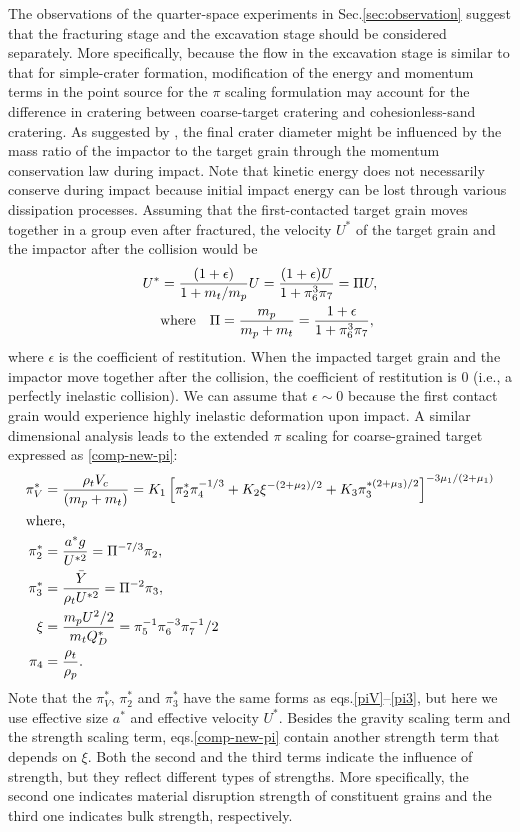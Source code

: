 \documentclass[3p,authoryear]{elsarticle}
\begin{document}
The observations of the quarter-space experiments in Sec.\ref{sec:observation} suggest that the fracturing stage and the excavation stage should be considered separately.
More specifically, because the flow in the excavation stage is similar to that for simple-crater formation, modification of the energy and momentum terms in the point source for the $\pi$ scaling formulation may account for the difference in cratering between coarse-target cratering and cohesionless-sand cratering.
As suggested by \citet{guettler2012}, the final crater diameter might be influenced by the mass ratio of the impactor to the target grain through the momentum conservation law during impact.
Note that kinetic energy does not necessarily conserve during impact because initial impact energy can be lost through various dissipation processes.
Assuming that the first-contacted target grain moves together in a group even after fractured, the velocity $U^*$ of the target grain and the impactor after the collision would be
\begin{align}
	U^*&=\frac{(1+\epsilon)}{1+m_t/m_p}U=\frac{(1+\epsilon)U}{1+\pi_6^3\pi_7}=\Pi U,\\
	&{\rm where}\quad \Pi=\frac{m_p}{m_p+m_t}=\frac{1+\epsilon}{1+\pi_6^3\pi_7},\notag
\end{align}
where $\epsilon$ is the coefficient of restitution.
When the impacted target grain and the impactor move together after the collision, the coefficient of restitution is 0 (i.e., a perfectly inelastic collision).
We can assume that $\epsilon \sim 0$ because the first contact grain would experience highly inelastic deformation upon impact.
A similar dimensional analysis leads to the extended $\pi$ scaling for coarse-grained target expressed as \eqref{comp-new-pi}:
\begin{align}
	\pi_V^*&=\frac{\rho_t V_c}{(m_p+m_t)}=K_1\left[\pi^*_2\pi_4^{-1/3}+K_2\xi^{-(2+\mu_2)/2}+K_3\pi_3^{*(2+\mu_3)/2} \right]^{-3\mu_1/(2+\mu_1)} \label{comp-new-pi}\\
	\intertext{where,}
	\pi_2^*&=\frac{a^*g}{U^{*2}}=\Pi^{-7/3}\pi_2, \notag\\
	 \pi_3^*&=\frac{\bar{Y}}{\rho_tU^{*2}}=\Pi^{-2}\pi_3, \notag\\
	 \xi&=\frac{m_pU^2/2}{m_tQ_D^*}=\pi_5^{-1}\pi_6^{-3}\pi_7^{-1}/2 \notag\\
	 \pi_4&=\frac{\rho_t}{\rho_p}.\notag
\end{align}
Note that the $\pi_V^*,\,\pi_2^*$ and $\pi_3^*$ have the same forms as eqs.\eqref{piV}--\eqref{pi3}, but here we use effective size $a^*$ and effective velocity $U^*$. Besides the gravity scaling term and the strength scaling term, eqs.\eqref{comp-new-pi} contain another strength term that depends on $\xi$. Both the second and the third terms indicate the influence of strength, but they reflect different types of strengths. More specifically, the second one indicates material disruption strength of constituent grains and the third one indicates bulk strength, respectively.
\end{document}
